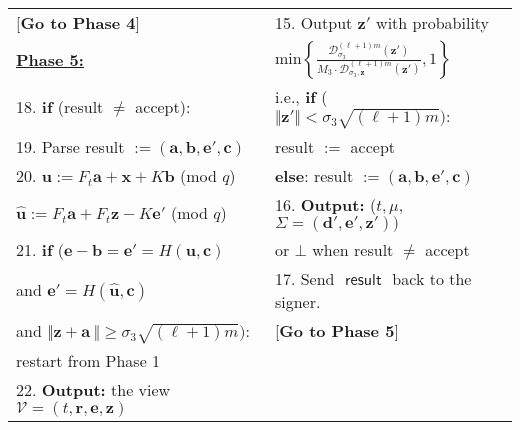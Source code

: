 \documentclass[runningheads]{llncs}
\def\bf{\mathbf}
\begin{document}
\begin{description}
\begin{figure*}[h]
\begin{tabular}{|  l | l | }
	
		 \hspace{0.5cm}[\textbf{Go to Phase 4}]&15.  Output $\mathbf{z}'$ with probability \\
			\textbf{\underline{Phase 5:}}	&\hspace{1.5cm} min$ \left\{ \frac{\mathcal{D}_{\sigma_3}^{(\ell+1)m}(\mathbf{z}')}{M_3 \cdot \mathcal{D}^{(\ell+1)m}_{ \sigma_3,\mathbf{z}}(\mathbf{z}')},1 \right\}$\\
	18. \textbf{if} (\textsf{result} $\neq$ \textsf{accept}):	&i.e.,  \textbf{if} ($\Vert\mathbf{z}' \Vert < \sigma_3\sqrt{(\ell+1)m}):$   \\
		19. \hspace{0.5cm} Parse \textsf{result} $:= (\mathbf{a}, \mathbf{b}, \mathbf{e}', \bf{c})$	& \hspace{1cm}  \textsf{result} $:= $ \textsf{accept} \\
		
		
			20.			\hspace{0.5cm}
			$\mathbf{u}:=F_t\mathbf{a}+\mathbf{x}+ K\mathbf{b}$ (mod $q$)	& 
			\hspace{0.5cm}\textbf{else}:  \textsf{result} $:= (\mathbf{a}, \mathbf{b}, \mathbf{e}', \bf{c})$\\
		\hspace{1.1cm}$\widehat{\mathbf{u}}:=F_t\mathbf{a}+F_t\mathbf{z}- K\mathbf{e}'$ (mod $q$)&16. \textbf{Output:} ($t, \mu$, $ \Sigma=(\mathbf{d}',\mathbf{e}', \mathbf{z}'))$\\
			
			
			21.		\hspace{0.5cm} \textbf{if} ($\mathbf{e}-\mathbf{b}=\mathbf{e}'=H(\mathbf{u}, \bf{c})$ & \hspace{1cm} or $\bot$ when \textsf{result }$\neq$ \textsf{accept}  \\
			  	\hspace{1.5cm} and $\mathbf{e}'=H(\widehat{\mathbf{u}}, \bf{c})$ & 17. Send $\textsf{        result      }$ back to the signer. \\
			 	
			 		
			\hspace{1.5cm}  and 	$\Vert \mathbf{z}+\mathbf{a}\ \Vert \geq \sigma_3\sqrt{(\ell+1)m})$:  & \hspace{0.5cm} [\textbf{Go to Phase 5}] \\

				\hspace{2cm}   restart from Phase 1 &\\
		
			22.		\textbf{Output:} the view $\mathcal{V}=(t, \mathbf{r},\mathbf{e}, \mathbf{z})$& \\
			\hline
		\end{tabular}
		

\end{figure*}
\end{description}
\end{document}
